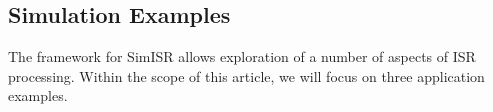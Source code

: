 \documentclass[draft,ras]{agutex}
\begin{document}
\begin{article}
%
%
%
%



\section{Simulation Examples}
The framework for SimISR allows exploration of a number of aspects of ISR processing. Within the scope of this article, we will focus on three application examples.


\end{article}
\end{document}
